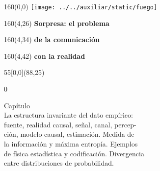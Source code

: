 \documentclass[shownotes,aspectratio=169]{beamer}
\newcounter{capitulo}
\newcommand{\unidad}{\thecapitulo \stepcounter{capitulo}}
\begin{document}
\begin{frame}

\begin{textblock}{160}(0,0)
\texttt{[image: ../../auxiliar/static/fuego]}
\end{textblock}

\begin{textblock}{160}(4,26)
\LARGE \textcolor{black!5}{\fontsize{22}{0}\selectfont \textbf{Sorpresa: el problema}}
\end{textblock}
\begin{textblock}{160}(4,34)
\LARGE \textcolor{black!5}{\fontsize{22}{0}\selectfont \textbf{de la comunicación}}
\end{textblock}
\begin{textblock}{160}(4,42)
\LARGE \textcolor{black!5}{\fontsize{22}{0}\selectfont \textbf{con la realidad}}
\end{textblock}



\begin{textblock}{55}[0,0](88,25)
\begin{turn}{0}
\parbox{7cm}{\sloppy\setlength\parfillskip{0pt}
\textcolor{black!0}{Capítulo \unidad} \\
\small\textcolor{black!5}{\hspace{-0.05cm}La estructura invariante del dato empírico:} \\
\small\textcolor{black!5}{\hspace{0cm}fuente, realidad causal, señal, canal, percep-} \\ \small\textcolor{black!5}{\hspace{-0.05cm}ción, modelo causal, estimación. Medida de} \\
\small\textcolor{black!5}{\hspace{-0.3cm}la información y máxima entropía. Ejemplos} \\
\small\textcolor{black!5}{\hspace{-0.45cm}de física estadística y codificación. Divergencia} \\
\small\textcolor{black!5}{\hspace{-0.45cm}entre distribuciones de probabilidad.} \\
}
\end{turn}
\end{textblock}

\end{frame}
\end{document}
